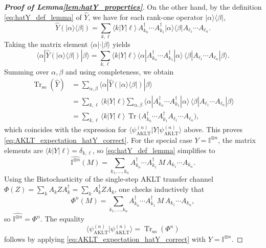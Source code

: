 \documentclass[11pt,a4paper]{article}
\begin{document}
\begin{proof}[\textbf{Proof of Lemma\ref{lem:hatY_properties}}]
On the other hand, by the definition \eqref{eq:hatY_def_lemma} of \(\widehat{Y}\), we have for each rank-one operator \(|\alpha\rangle\langle\beta|\),
\[
\widehat{Y}(|\alpha\rangle\langle\beta|)
=
\sum_{k,\ell}
\langle k|Y|\ell\rangle\,
A_{k_n}^{\dagger}\cdots A_{k_1}^{\dagger}|\alpha\rangle\langle\beta|A_{\ell_1}\cdots A_{\ell_n}.
\]
Taking the matrix element \(\langle\alpha|\cdot|\beta\rangle\) yields
\[
\langle\alpha|\widehat{Y}(|\alpha\rangle\langle\beta|)|\beta\rangle
=
\sum_{k,\ell}
\langle k|Y|\ell\rangle\,
\langle\alpha|A_{k_n}^{\dagger}\cdots A_{k_1}^{\dagger}|\alpha\rangle\,
\langle\beta|A_{\ell_1}\cdots A_{\ell_n}|\beta\rangle.
\]
Summing over \(\alpha,\beta\) and using completeness, we obtain
\begin{align*}
\operatorname{Tr}_{\mathrm{so}}(\widehat{Y})
&=
\sum_{\alpha,\beta}
\langle\alpha|\widehat{Y}(|\alpha\rangle\langle\beta|)|\beta\rangle \\
&=
\sum_{k,\ell}\langle k|Y|\ell\rangle
\sum_{\alpha,\beta}
\langle\alpha|A_{k_n}^{\dagger}\cdots A_{k_1}^{\dagger}|\alpha\rangle\,
\langle\beta|A_{\ell_1}\cdots A_{\ell_n}|\beta\rangle \\
&=
\sum_{k,\ell}\langle k|Y|\ell\rangle\,
\operatorname{Tr}\bigl(A_{k_n}^{\dagger}\cdots A_{k_1}^{\dagger}A_{\ell_1}\cdots A_{\ell_n}\bigr),
\end{align*}
which coincides with the expression for \(\langle\psi_{\mathrm{AKLT}}^{(n)}|Y|\psi_{\mathrm{AKLT}}^{(n)}\rangle\) above. This proves \eqref{eq:AKLT_expectation_hatY_correct}.   For the special case \(Y=\mathbb{I}^{\otimes n}\), the matrix elements are \(\langle k|Y|\ell\rangle=\delta_{k,\ell}\), so \eqref{eq:hatY_def_lemma} simplifies to
\[
\widehat{\mathbb{I}^{\otimes n}}(M)
=
\sum_{k_1,\dots,k_n}
A_{k_n}^{\dagger}\cdots A_{k_1}^{\dagger}\,M\,A_{k_1}\cdots A_{k_n}.
\]
Using the Bistochasticity  of the single-step AKLT  transfer channel \(\Phi(Z)=\sum_k A_k Z A_k^{\dagger} = \sum_k A_k^{\dagger} Z A_k\), one checks inductively that
\[
\Phi^{n}(M)
=
\sum_{k_1,\dots,k_n}
A_{k_n}^{\dagger}\cdots A_{k_1}^{\dagger}\,M\,A_{k_1}\cdots A_{k_n},
\]
so \(\widehat{\mathbb{I}^{\otimes n}}=\Phi^{n}\). The equality
\[
\langle\psi_{\mathrm{AKLT}}^{(n)}|\psi_{\mathrm{AKLT}}^{(n)}\rangle
=
\operatorname{Tr}_{\mathrm{so}}(\Phi^{n})
\]
follows by applying \eqref{eq:AKLT_expectation_hatY_correct} with \(Y=\mathbb{I}^{\otimes n}\).


\end{proof}
\end{document}
